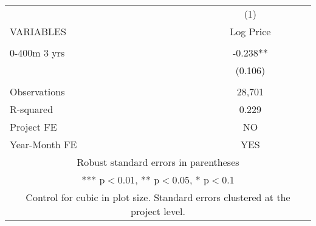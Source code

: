 \begin{tabular}{lc} \hline
 & (1) \\
VARIABLES & Log Price \\ \hline
 &  \\
0-400m 3 yrs & -0.238** \\
 & (0.106) \\
 &  \\
Observations & 28,701 \\
R-squared & 0.229 \\
Project FE & NO \\
 Year-Month FE & YES \\ \hline
\multicolumn{2}{c}{ Robust standard errors in parentheses} \\
\multicolumn{2}{c}{ *** p$<$0.01, ** p$<$0.05, * p$<$0.1} \\
\multicolumn{2}{c}{ Control for cubic in plot size. Standard errors clustered at the project level.} \\
\end{tabular}
